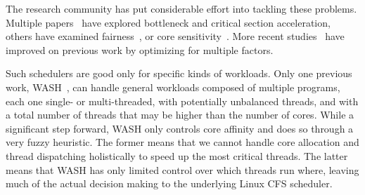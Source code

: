 


The research community has put considerable effort into tackling these problems. Multiple papers~\cite{han2018multicore,chronaki2017task,joao2012bottleneck,suleman2009accelerating,du2013criticality} have explored bottleneck and critical section acceleration, others have examined fairness~\cite{zahedi2018amdahl,wang2016rebudget,van2012scheduling,li2009efficient,li2007efficient}, or core sensitivity~\cite{cao2012yin,kumar2004single,becchi2006dynamic}. More recent studies~\cite{kim2018exploring,kim2016fairness,saez2012leveraging,van2013fairness,joao2013utility} have improved on previous work by optimizing for multiple factors.

Such schedulers are good only for specific kinds of workloads. Only one previous work, WASH~\cite{jibaja2016portable}, can handle general workloads composed of multiple programs, each one single- or multi-threaded, with potentially unbalanced threads, and with a total number of threads that may be higher than the number of cores. While a significant step forward, WASH only controls core affinity and does so through a very fuzzy heuristic. The former means that we cannot handle core allocation and thread dispatching holistically to speed up the most critical threads. The latter means that WASH has only limited control over which threads run where, leaving much of the actual decision making to the underlying Linux CFS scheduler.

